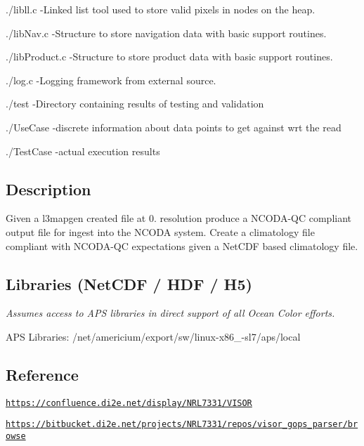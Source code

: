 \begin{DoxyItemize}
\begin{DoxyItemize}
\item ./libll.c -\/\-Linked list tool used to store valid pixels in nodes on the heap.
\item ./lib\-Nav.c -\/\-Structure to store navigation data with basic support routines.
\item ./lib\-Product.c -\/\-Structure to store product data with basic support routines.
\item ./log.c -\/\-Logging framework from external source.
\end{DoxyItemize}
\item ./test -\/\-Directory containing results of testing and validation
\item ./\-Use\-Case -\/discrete information about data points to get against wrt the read
\item ./\-Test\-Case -\/actual execution results
\end{DoxyItemize}

\subsection*{Description}

Given a l3mapgen created file at 0. resolution produce a N\-C\-O\-D\-A-\/\-Q\-C compliant output file for ingest into the N\-C\-O\-D\-A system. Create a climatology file compliant with N\-C\-O\-D\-A-\/\-Q\-C expectations given a Net\-C\-D\-F based climatology file.

\subsection*{Libraries (Net\-C\-D\-F / H\-D\-F / H5)}

{\itshape Assumes access to A\-P\-S libraries in direct support of all Ocean Color efforts.}

A\-P\-S Libraries\-: {\ttfamily /net/americium/export/sw/linux-\/x86\-\_-\/sl7/aps/local}

\subsection*{Reference}


\begin{DoxyItemize}
\item \href{https://confluence.di2e.net/display/NRL7331/VISOR}{\tt https\-://confluence.\-di2e.\-net/display/\-N\-R\-L7331/\-V\-I\-S\-O\-R}
\item \href{https://bitbucket.di2e.net/projects/NRL7331/repos/visor_gops_parser}{\tt https\-://bitbucket.\-di2e.\-net/projects/\-N\-R\-L7331/repos/visor\-\_\-gops\-\_\-parser/browse}
\end{DoxyItemize}

